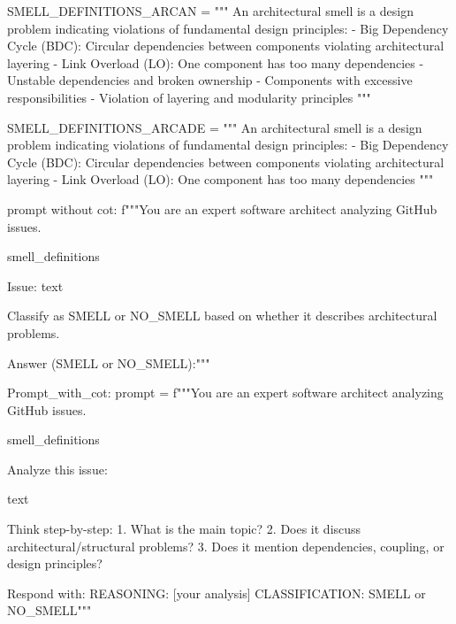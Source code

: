 SMELL_DEFINITIONS_ARCAN = """
An architectural smell is a design problem indicating violations of fundamental design principles:
- Big Dependency Cycle (BDC): Circular dependencies between components violating architectural layering
- Link Overload (LO): One component has too many dependencies
- Unstable dependencies and broken ownership
- Components with excessive responsibilities
- Violation of layering and modularity principles
"""

SMELL_DEFINITIONS_ARCADE = """
An architectural smell is a design problem indicating violations of fundamental design principles:
- Big Dependency Cycle (BDC): Circular dependencies between components violating architectural layering
- Link Overload (LO): One component has too many dependencies
"""

prompt without cot: 
f"""You are an expert software architect analyzing GitHub issues.

{smell_definitions}

Issue:
{text}

Classify as SMELL or NO_SMELL based on whether it describes architectural problems.

Answer (SMELL or NO_SMELL):"""




Prompt_with_cot:
        prompt = f"""You are an expert software architect analyzing GitHub issues.

{smell_definitions}

Analyze this issue:

{text}

Think step-by-step:
1. What is the main topic?
2. Does it discuss architectural/structural problems?
3. Does it mention dependencies, coupling, or design principles?

Respond with:
REASONING: [your analysis]
CLASSIFICATION: SMELL or NO_SMELL"""